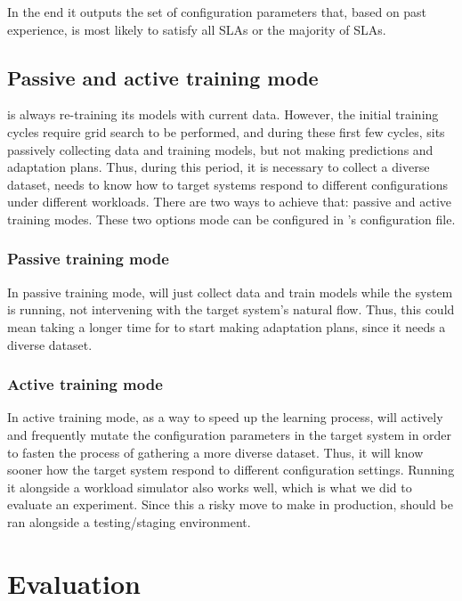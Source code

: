 In the end it outputs the set of configuration parameters that, based on past experience, is most likely to satisfy all SLAs or the majority of SLAs.

\subsection{Passive and active training mode}

\projectname{} is always re-training its models with current data. However, the initial training cycles require grid search to be performed, and during these first few cycles, \projectname{} sits passively collecting data and training models, but not making predictions and adaptation plans. Thus, during this period, it is necessary to collect a diverse dataset, \projectname{} needs to know how to target systems respond to different configurations under different workloads. There are two ways to achieve that: passive and active training modes. These two options mode can be configured in \projectname{}'s configuration file.

\subsubsection{Passive training mode}

In passive training mode, \projectname{} will just collect data and train models while the system is running, not intervening with the target system's natural flow. Thus, this could mean taking a longer time for \projectname{} to start making adaptation plans, since it needs a diverse dataset.

\subsubsection{Active training mode}

In active training mode, as a way to speed up the learning process, \projectname{} will actively and frequently mutate the configuration parameters in the target system in order to fasten the process of gathering a more diverse dataset. Thus, it will know sooner how the target system respond to different configuration settings. Running it alongside a workload simulator also works well, which is what we did to evaluate an experiment. Since this a risky move to make in production, \projectname{} should be ran alongside a testing/staging environment.


\section{Evaluation}

